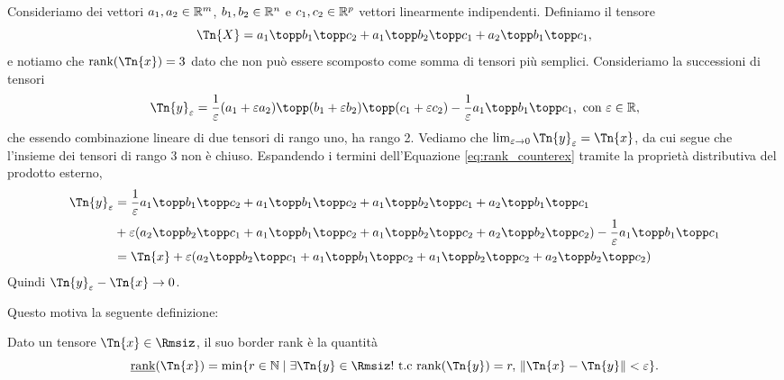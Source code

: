 \begin{example}
  Consideriamo dei vettori $ a_1,a_2 \in \mathbb{R}^m$, $b_1,b_2 \in \mathbb{R}^n$ e $c_1,c_2\in \mathbb{R}^p $ vettori
  linearmente indipendenti.  Definiamo il tensore 
  \begin{equation}
    \Tn{X} = a_1 \topp  b_1 \topp c_2 + a_1 \topp b_2 \topp c_1 + a_2 \topp b_1 \topp c_1,
  \end{equation}
  e notiamo che $ \rk(\Tn{x}) = 3 $ dato che non può
  essere scomposto come somma di tensori più semplici.
  Consideriamo la successioni di tensori 
  \begin{equation}
  \label{eq:rank_counterex}
  \Tn{y}_\varepsilon = \frac{1}{\varepsilon}\left( a_1 +
  \varepsilon a_2 \right) \topp (b_1 + \varepsilon b_2) \topp (c_1 + \varepsilon c_2) -
  \frac{1}{\varepsilon} a_1 \topp b_1 \topp c_1, \text{ con } \varepsilon \in \R,
  \end{equation}
  che essendo combinazione lineare di due tensori di rango uno, ha rango 2.
  Vediamo che $ \lim_{\varepsilon \to 0} \Tn{y}_\varepsilon = \Tn{x} $, da cui segue che l'insieme dei tensori di rango 3 non è chiuso.
  Espandendo i termini dell'Equazione \ref{eq:rank_counterex} tramite la proprietà distributiva del prodotto esterno,
  \begin{equation}
    \begin{aligned}
      \Tn{y}_\varepsilon &=  \frac{1}{\varepsilon} a_1 \topp b_1 \topp c_2 + a_1 \topp b_1 \topp c_2 + a_1 \topp b_2 \topp c_1
      +a_2 \topp b_1 \topp c_1  \\ &+ \varepsilon \left(a_2 \topp b_2 \topp c_1 + a_1 \topp b_1 \topp c_2 +
      a_1 \topp b_2 \topp c_2 + a_2 \topp b_2 \topp c_2 \right) - \frac{1}{\varepsilon} a_1 \topp
      b_1 \topp c_1 \\
                         &= \Tn{x} + \varepsilon\left(a_2 \topp b_2 \topp c_1 + a_1 \topp b_1 \topp c_2 +
      a_1 \topp b_2 \topp c_2 + a_2 \topp b_2 \topp c_2 \right)
    \end{aligned}
  \end{equation}
  Quindi $ \Tn{y}_\varepsilon - \Tn{x} \to 0 $.
\end{example}

Questo motiva la seguente definizione:

\begin{definition}
  Dato un tensore $ \Tn{x} \in \Rmsiz $, il suo border rank è la quantità
  \[
  \brk(\Tn{x}) = \min \left\{ r \in \N \mid \exists \Tn{y} \in \Rmsiz! \text{ t.c }
  \rk(\Tn{y})=r, \, \|\Tn{x} - \Tn{y}\|  < \varepsilon \right\}
  .\] 
\end{definition}


